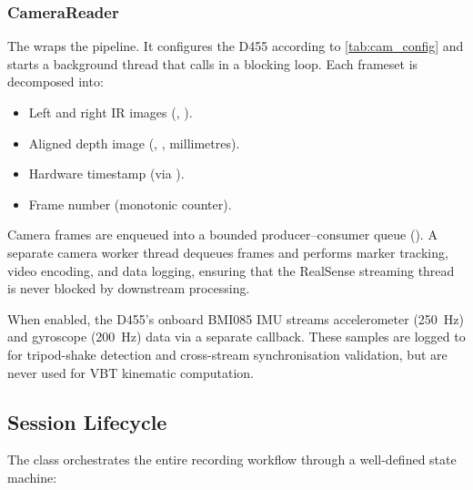 \subsubsection{CameraReader}
The  wraps the  pipeline.
It configures the D455 according to \cref{tab:cam_config} and starts a background thread that calls  in a blocking loop.
Each frameset is decomposed into:
\begin{itemize}[nosep]
  \item Left and right IR images (, ).
  \item Aligned depth image (, , millimetres).
  \item Hardware timestamp (via ).
  \item Frame number (monotonic counter).
\end{itemize}

Camera frames are enqueued into a bounded producer--consumer queue ().
A separate camera worker thread dequeues frames and performs marker tracking, video encoding, and data logging, ensuring that the RealSense streaming thread is never blocked by downstream processing.

When enabled, the D455's onboard BMI085 IMU streams accelerometer (\SI{250}{\hertz}) and gyroscope (\SI{200}{\hertz}) data via a separate callback.
These samples are logged to  for tripod-shake detection and cross-stream synchronisation validation, but are never used for VBT kinematic computation.


\subsection{Session Lifecycle}\label{sec:session}

The  class orchestrates the entire recording workflow through a well-defined state machine:

